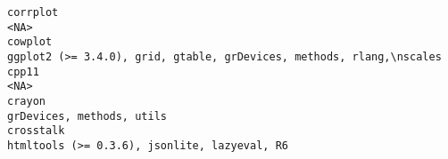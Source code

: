 \documentclass[
  letterpaper,
  DIV=11,
  numbers=noendperiod]{scrreprt}
\begin{document}
\begin{verbatim}
corrplot                                                                                                                                                                                                                                                                                                                                                                                                                                                                                                                                                                                                              <NA>
cowplot                                                                                                                                                                                                                                                                                                                                                                                                                                                                                                                                               ggplot2 (>= 3.4.0), grid, gtable, grDevices, methods, rlang,\nscales
cpp11                                                                                                                                                                                                                                                                                                                                                                                                                                                                                                                                                                                                                 <NA>
crayon                                                                                                                                                                                                                                                                                                                                                                                                                                                                                                                                                                                           grDevices, methods, utils
crosstalk                                                                                                                                                                                                                                                                                                                                                                                                                                                                                                                                                                     htmltools (>= 0.3.6), jsonlite, lazyeval, R6

\end{verbatim}
\end{document}
